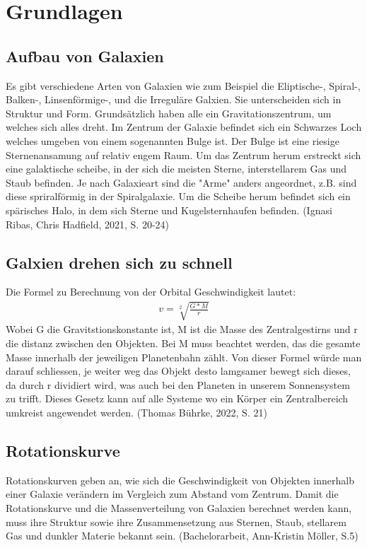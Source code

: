 
\section{Grundlagen}

\subsection{Aufbau von Galaxien}

Es gibt verschiedene Arten von Galaxien wie zum Beispiel die Eliptische-, Spiral-, Balken-, Linsenförmige-, 
und die Irreguläre Galxien. Sie unterscheiden sich in Struktur und Form. Grundsätzlich haben alle ein 
Gravitationszentrum, um welches sich alles dreht. Im Zentrum der Galaxie befindet sich ein Schwarzes 
Loch welches umgeben von einem sogenannten Bulge ist. Der Bulge ist eine riesige Sternenansamung auf relativ engem Raum. Um das 
Zentrum herum erstreckt sich eine galaktische scheibe, in der sich die meisten Sterne, interstellarem Gas und Staub befinden. 
Je nach Galaxieart sind die "Arme" anders angeordnet, z.B. sind diese spriralförmig in der Spiralgalaxie. Um die Scheibe herum befindet 
sich ein spärisches Halo, in dem sich Sterne und Kugelsternhaufen befinden. 
(Ignasi Ribas, Chris Hadfield, 2021, S. 20-24)

\subsection{Galxien drehen sich zu schnell}
Die Formel zu Berechnung von der Orbital Geschwindigkeit lautet:
\begin{align*}    
    v = \sqrt[2]{\frac{G * M}{r}}
\end{align*}
Wobei G die Gravitstionskonstante ist, M ist die Masse des Zentralgestirns und r die distanz zwischen den Objekten. Bei M muss 
beachtet werden, das die gesamte Masse innerhalb der jeweiligen Planetenbahn zählt. 
Von dieser Formel würde man darauf schliessen, je weiter weg das Objekt desto lamgsamer bewegt sich 
dieses, da durch r dividiert wird, was auch bei den Planeten in unserem Sonnensystem zu trifft. Dieses Gesetz kann auf alle
Systeme wo ein Körper ein Zentralbereich umkreist angewendet werden.  (Thomas Bührke, 2022, S. 21)
\subsection{Rotationskurve}
Rotationskurven geben an, wie sich die Geschwindigkeit von Objekten innerhalb einer Galaxie verändern im Vergleich zum Abstand vom Zentrum. 
Damit die Rotationskurve und die Massenverteilung von Galaxien berechnet werden kann, muss ihre Struktur sowie ihre Zusammensetzung 
aus Sternen, Staub, stellarem Gas und dunkler Materie bekannt sein. (Bachelorarbeit, Ann-Kristin Möller, S.5) 

